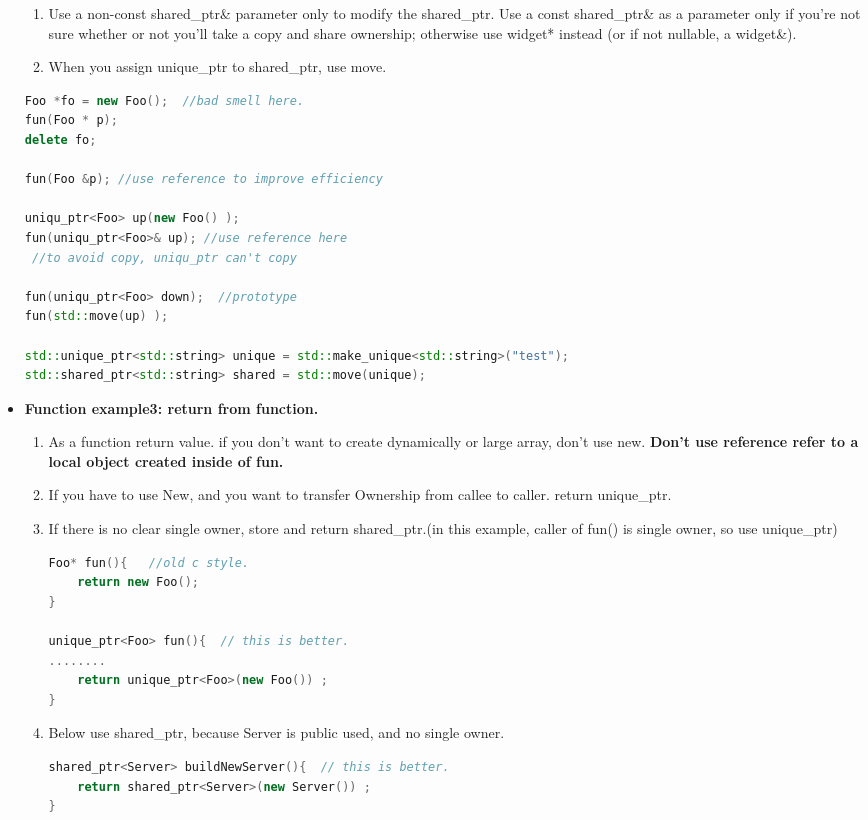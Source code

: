 \documentclass[a4paper,11pt,twoside]{book}
\begin{document}
\begin{itemize}
\begin{enumerate}
\item Use a non-const shared\_ptr\& parameter only to modify the shared\_ptr. Use a const shared\_ptr\& as a parameter only if you're not sure whether or not you'll take a copy and share ownership; otherwise use widget* instead (or if not nullable, a widget\&).

\item When you assign unique\_ptr to shared\_ptr, use move.
\end{enumerate}

\begin{lstlisting}[frame=single, language=c++]
Foo *fo = new Foo();  //bad smell here.
fun(Foo * p);
delete fo;

fun(Foo &p); //use reference to improve efficiency

uniqu_ptr<Foo> up(new Foo() );
fun(uniqu_ptr<Foo>& up); //use reference here
 //to avoid copy, uniqu_ptr can't copy

fun(uniqu_ptr<Foo> down);  //prototype
fun(std::move(up) );

std::unique_ptr<std::string> unique = std::make_unique<std::string>("test");
std::shared_ptr<std::string> shared = std::move(unique);
\end{lstlisting}

\item \textbf{Function example3: return from function.}
\begin{enumerate}
\item As a function return value. if you don't want to create dynamically or large array, don't use new. \textbf{Don't  use reference refer to a local object created inside of fun.}

\item If you have to use New, and you want to transfer Ownership from callee to caller. return unique\_ptr.

\item If there is no clear single owner, store and return shared\_ptr.(in this example, caller of fun() is single owner, so use unique\_ptr)

\begin{lstlisting}[frame=single, language=c++]
Foo* fun(){   //old c style.
	return new Foo();
}

unique_ptr<Foo> fun(){  // this is better.
........
	return unique_ptr<Foo>(new Foo()) ;
}
\end{lstlisting}

\item Below use shared\_ptr, because Server is public used, and no single owner.
\begin{lstlisting}[frame=single, language=c++]
shared_ptr<Server> buildNewServer(){  // this is better.
	return shared_ptr<Server>(new Server()) ;
}


\end{lstlisting}
\end{enumerate}
\end{itemize}
\end{document}
